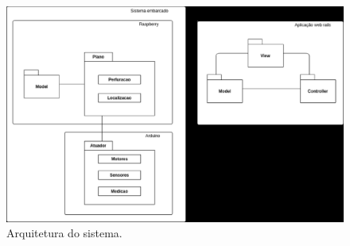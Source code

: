 \begin{figure}[!htbp]
	\begin{center}
		\includegraphics[width=.8\textwidth]{figuras/Arquitetura.eps}
		\caption{\label{fig:arquitetura_sistema}Arquitetura do sistema.}
	\end{center}
\end{figure}